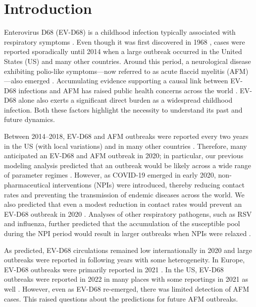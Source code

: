 \documentclass[12pt]{article}
\begin{document}
\pagebreak

\section{Introduction}

Enterovirus D68 (EV-D68) is a childhood infection typically associated with respiratory symptoms \citep{oberste2004enterovirus}.
Even though it was first discovered in 1968 \citep{schieble1967probable}, cases were reported sporadically until 2014 when a large outbreak occurred in the United States (US) \citep{messacar20162014} and many other countries.
Around this period, a neurological disease exhibiting polio-like symptoms---now referred to as acute flaccid myelitis (AFM)---also emerged \citep{roux2014polio, mckay2018increase}.
Accumulating evidence supporting a causal link between EV-D68 infections and AFM has raised public health concerns across the world \citep{dyda2018association,messacar2018enterovirus,park2021epidemiological,vogt2022enterovirus,aguglia2023contemporary}.
EV-D68 alone also exerts a significant direct burden as a widespread childhood infection.
Both these factors highlight the necessity to understand its past and future dynamics.

Between 2014--2018, EV-D68 and AFM outbreaks were reported every two years in the US (with local variations) and in many other countries \citep{messacar2019continued}.
Therefore, many anticipated an EV-D68 and AFM outbreak in 2020;
in particular, our previous modeling analysis predicted that an outbreak would be likely across a wide range of parameter regimes \citep{park2021epidemiological}.
However, as COVID-19 emerged in early 2020, non-pharmaceutical interventions (NPIs) were introduced, thereby reducing contact rates and preventing the transmission of endemic diseases across the world.
We also predicted that even a modest reduction in contact rates would prevent an EV-D68 outbreak in 2020 \citep{park2021epidemiological}.
Analyses of other respiratory pathogens, such as RSV and influenza, further predicted that the accumulation of the susceptible pool during the NPI period would result in larger outbreaks when NPIs were relaxed \citep{baker2020impact}.

As predicted, EV-D68 circulations remained low internationally in 2020 and large outbreaks were reported in following years with some heterogeneity.
In Europe, EV-D68 outbreaks were primarily reported in 2021 \citep{benschop2021re,andres2022enterovirus}.
In the US, EV-D68 outbreaks were reported in 2022 in many places \citep{ma2022increase} with some reportings in 2021 as well \citep{fall2022circulation}.
However, even as EV-D68 re-emerged, there was limited detection of AFM cases.
This raised questions about the predictions for future AFM outbreaks.
\end{document}
